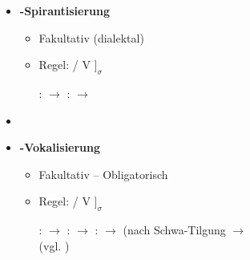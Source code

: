 \begin{frame}

\begin{itemize}
	\item \textbf{-Spirantisierung}

	\begin{itemize}
		\item Fakultativ (dialektal)
		\item Regel:  \ras {} / V\underline{\quad} $]_\sigma$

\eal	
	\ex {}:  $\rightarrow$ \textipa{[za:xst]}
	\ex {}:  $\rightarrow$ \textipa{[f{\textscr}\t{ɔɪ}.dI\c{c}]}
\zl

	\end{itemize}

	\item[]
	\item \textbf{\textipa{/{\textscr}/}-Vokalisierung}
	
	\begin{itemize}
		\item Fakultativ -- Obligatorisch
		\item Regel: \textipa{/{\textscr}/} \ras \textipa{[5]} / V\underline{\quad} $]_\sigma$

	\eal
		\ex {}:  $\rightarrow$ \textipa{[Po:5]}
		\ex {}:  $\rightarrow$ \textipa{[fE5n]}
		\ex {}:  $\rightarrow$ \textipa{[le:.{\textscr}@5]} (nach Schwa-Tilgung $\rightarrow$ \textipa{[le:.{\textscr}5]}\\
		(vgl. )
	\zl
	
	\end{itemize}

\end{itemize}

\end{frame}




